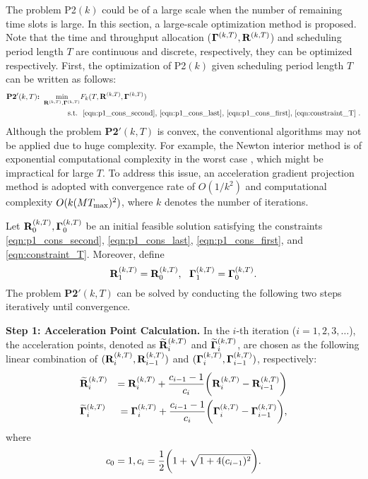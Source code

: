 \section{}
\label{sec:kernel-policy}
The problem P2$(k)$ could be of a large scale when the number of remaining time slots is large. In this section, a large-scale optimization method is proposed.
Note that the time and throughput allocation ($\mathbf{\Gamma}^{(k,T)}, \mathbf{R}^{(k,T)}$) and scheduling period length $T$ are continuous and discrete, respectively, they can be optimized respectively. First, the optimization of P2$(k)$ given scheduling period length $T$ can be written as follows:
\begin{align}
    \textbf{P2$'(k,T)$:~}
    \min_{ \mathbf{R}^{(k,T)}, \mathbf{\Gamma}^{(k,T)} } &F_k( T, \mathbf{R}^{(k,T)}, \mathbf{\Gamma}^{(k,T)} )
    \nonumber
    \\\nonumber
    \text{s.t.~} & \text{ \eqref{eqn:p1_cons_second}, \eqref{eqn:p1_cons_last}, \eqref{eqn:p1_cons_first}, \eqref{eqn:constraint_T} }.
\end{align}
Although the problem \textbf{P2$'(k,T)$} is convex, the conventional algorithms may not be applied due to huge complexity.
For example, the Newton interior method is of exponential computational complexity in the worst case \cite{monteiro1994}, which might be impractical for large $T$.
To address this issue, an acceleration gradient projection method \cite{Nesterov83} is adopted with convergence rate of $O(1/k^2)$ and computational complexity $O(k (M{T_{\max}})^2)$, where $k$ denotes the number of iterations.

Let $\mathbf{R}^{(k,T)}_{0}, \mathbf{\Gamma}^{(k,T)}_{0}$ be an initial feasible solution satisfying the constraints \eqref{eqn:p1_cons_second}, \eqref{eqn:p1_cons_last}, \eqref{eqn:p1_cons_first}, and \eqref{eqn:constraint_T}.
Moreover, define
$$\mathbf{R}^{(k,T)}_{1}=\mathbf{R}^{(k,T)}_{0}, ~~\mathbf{\Gamma}^{(k,T)}_{1}=\mathbf{\Gamma}^{(k,T)}_{0}.$$
The problem \textbf{P2$'(k,T)$} can be solved by conducting the following two steps iteratively until convergence. 

\textbf{Step 1: Acceleration Point Calculation.}
In the $i$-th iteration ($i=1,2,3,\dots$), the acceleration points, denoted as $\widetilde{\mathbf{R}}^{(k,T)}_{i}$ and $\widetilde{\mathbf{\Gamma}}^{(k,T)}_{i}$, are chosen as the following linear combination of $(\mathbf{R}^{(k,T)}_{i}, \mathbf{R}^{(k,T)}_{i-1})$ and $(\mathbf{\Gamma}^{(k,T)}_{i}, \mathbf{\Gamma}^{(k,T)}_{i-1})$, respectively:
\begin{eqnarray*}
    &\widetilde{\mathbf{R}}^{(k,T)}_{i} &= \mathbf{R}^{(k,T)}_{i} + \frac{c_{i-1}-1}{c_{i}} \bigg(
        \mathbf{R}^{(k,T)}_{i} - \mathbf{R}^{(k,T)}_{i-1}
    \bigg)\nonumber
    \\
    &\widetilde{\mathbf{\Gamma}}^{(k,T)}_{i} &= \mathbf{\Gamma}^{(k,T)}_{i} + \frac{c_{i-1}-1}{c_{i}}  \bigg(
        \mathbf{\Gamma}^{(k,T)}_{i} - \mathbf{\Gamma}^{(k,T)}_{i-1} 
    \bigg),\nonumber
\end{eqnarray*}
where
\begin{align*}
    c_{0} = 1, c_{i} = \frac{1}{2} \bigg( 1+\sqrt{ 1+4(c_{i-1})^2 } \bigg).
\end{align*}

